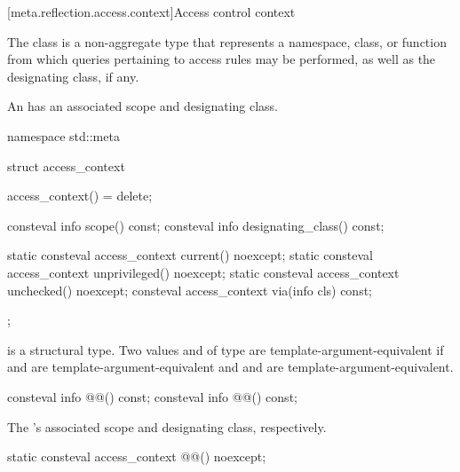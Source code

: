 [meta.reflection.access.context]{Access control context}

\pnum
The  class is a non-aggregate type
that represents a namespace, class, or function
from which queries pertaining to access rules may be performed,
as well as the designating class, if any.

%
\pnum
An  has an associated scope and designating class.

%
\begin{codeblock}
namespace std::meta {
  struct access_context {
    access_context() = delete;

    consteval info scope() const;
    consteval info designating_class() const;

    static consteval access_context current() noexcept;
    static consteval access_context unprivileged() noexcept;
    static consteval access_context unchecked() noexcept;
    consteval access_context via(info cls) const;
  };
}
\end{codeblock}

\pnum
{} is a structural type.
Two values  and  of type 
are template-argument-equivalent
if  and 
are template-argument-equivalent
and  and 
are template-argument-equivalent.

\begin{itemdecl}
consteval info @@() const;
consteval info @@() const;
\end{itemdecl}

\begin{itemdescr}
\pnum
\returns
The 's associated scope
and designating class, respectively.
\end{itemdescr}

\begin{itemdecl}
static consteval access_context @@() noexcept;
\end{itemdecl}

